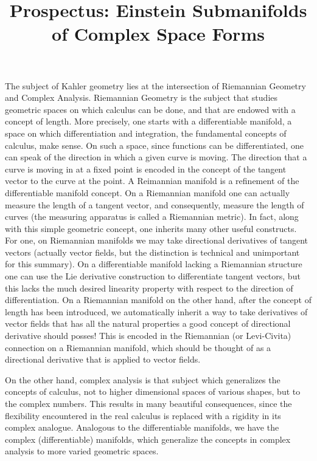 \documentclass[11pt]{amsart}
\theoremstyle{definition}
\theoremstyle{definition}
\begin{document}
\parskip 6pt
\parindent 0pt
\baselineskip 14pt

\title{Prospectus: Einstein Submanifolds of Complex Space Forms}
\maketitle
%
The subject of Kahler geometry lies at the intersection of Riemannian Geometry and Complex Analysis.  
%
Riemannian Geometry is the subject that studies geometric spaces on which calculus can be done, and that are endowed with a concept of length.  More precisely, one starts with a differentiable manifold, a space on which differentiation and integration, the fundamental concepts of calculus, make sense.  On such a space, since functions can be differentiated, one can speak of the direction in which a given curve is moving.  The direction that a curve is moving in at a fixed point is encoded in the concept of the tangent vector to the curve at the point.  A Reimannian manifold is a refinement of the differentiable manifold concept.  On a Riemannian manifold one can actually measure the length of a tangent vector, and consequently, measure the length of curves (the measuring apparatus is called a Riemannian metric).  In fact, along with this simple geometric concept, one inherits many other useful constructs.  For one, on Riemannian manifolds we may take directional derivatives of tangent vectors (actually vector fields, but the distinction is technical and unimportant for this summary).  On a differentiable manifold lacking a Riemannian structure one can use the Lie derivative construction to differentiate tangent vectors, but this lacks the much desired linearity property with respect to the direction of differentiation.  On a Riemannian manifold on the other hand, after the concept of length has been introduced, we automatically inherit a way to take derivatives of vector fields that has all the natural properties a good concept of directional derivative should posses!  This is encoded in the Riemannian (or Levi-Civita) connection on a Riemannian manifold, which should be thought of as a directional derivative that is applied to vector fields.

On the other hand, complex analysis is that subject which generalizes the concepts of calculus, not to higher dimensional spaces of various shapes, but to the complex numbers.  This results in many beautiful consequences, since the flexibility encountered in the real calculus is replaced with a rigidity in its complex analogue.  Analogous to the differentiable manifolds, we have the complex (differentiable) manifolds, which generalize the concepts in complex analysis to more varied geometric spaces.
\end{document}
